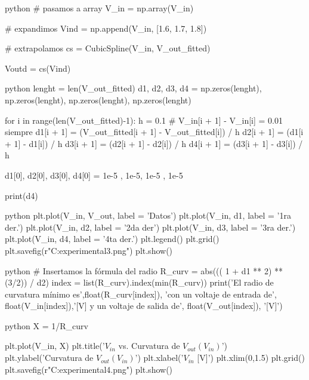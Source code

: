 \begin{sourcecode}[\label{codigo-python}]{python}
# pasamos a array
V_in = np.array(V_in)

# expandimos
Vind = np.append(V_in, [1.6, 1.7, 1.8])

# extrapolamos
cs = CubicSpline(V_in, V_out_fitted)

Voutd = cs(Vind)
\end{sourcecode}

\begin{sourcecode}[\label{codigo-python}]{python}
lenght = len(V_out_fitted)
d1, d2, d3, d4 = np.zeros(lenght), np.zeros(lenght), np.zeros(lenght), np.zeros(lenght)

for i in range(len(V_out_fitted)-1):
    h = 0.1 # V_in[i + 1] - V_in[i] = 0.01 siempre
    d1[i + 1]  = (V_out_fitted[i + 1] - V_out_fitted[i]) / h
    d2[i + 1] = (d1[i + 1] - d1[i]) / h
    d3[i + 1] = (d2[i + 1] - d2[i]) / h
    d4[i + 1] = (d3[i + 1] - d3[i]) / h
   
d1[0], d2[0], d3[0], d4[0]  = 1e-5 , 1e-5, 1e-5 , 1e-5

print(d4)
\end{sourcecode}

\begin{sourcecode}[\label{codigo-python}]{python}
plt.plot(V_in, V_out, label = 'Datos')
plt.plot(V_in, d1, label = '1ra der.')
plt.plot(V_in, d2, label = '2da der')
plt.plot(V_in, d3, label = '3ra der.')
plt.plot(V_in, d4, label = '4ta der.')
plt.legend()
plt.grid()
plt.savefig(r"C:\Users\Usuario\Documents\Astro experimental\graf3.png")
plt.show()
\end{sourcecode}

\begin{sourcecode}[\label{codigo-python}]{python}
# Insertamos la fórmula del radio
R_curv = abs((( 1 + d1 ** 2) ** (3/2)) / d2)
index = list(R_curv).index(min(R_curv))
print('El radio de curvatura mínimo es',float(R_curv[index]), 'con un voltaje de entrada de',
      float(V_in[index]),'[V] y un voltaje de salida de', float(V_out[index]), '[V]')
\end{sourcecode}

\begin{sourcecode}[\label{codigo-python}]{python}
X = 1/R_curv

plt.plot(V_in, X)
plt.title('$V_{in}$ vs. Curvatura de $V_{out}(V_{in})$')
plt.ylabel('Curvatura de $V_{out}(V_{in})$')
plt.xlabel('$V_{in}$ [V]')
plt.xlim(0,1.5)
plt.grid()
plt.savefig(r"C:\Users\Usuario\Documents\Astro experimental\graf4.png")
plt.show()
\end{sourcecode}

